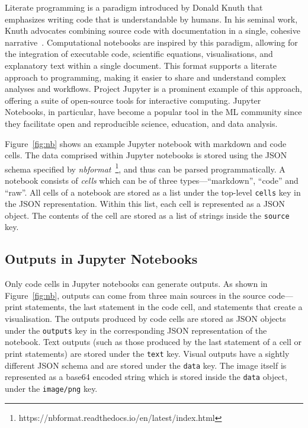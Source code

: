 Literate programming is a paradigm introduced by Donald Knuth that emphasizes writing code that is understandable by humans. In his seminal work, Knuth advocates combining source code with documentation in a single, cohesive narrative~\cite{knuth1984literate}. Computational notebooks are inspired by this paradigm, allowing for the integration of executable code, scientific equations, visualisations, and explanatory text within a single document. This format supports a literate approach to programming, making it easier to share and understand complex analyses and workflows. Project Jupyter is a prominent example of this approach, offering a suite of open-source tools for interactive computing. Jupyter Notebooks, in particular, have become a popular tool in the ML community since they facilitate open and reproducible science, education, and data analysis.

Figure~\ref{fig:nb} shows an example Jupyter notebook with markdown and code cells. The data comprised within Jupyter notebooks is stored using the JSON schema specified by \emph{nbformat}~\footnote{https://nbformat.readthedocs.io/en/latest/index.html}, and thus can be parsed programmatically. A notebook consists of \emph{cells} which can be of three types---``markdown'', ``code'' and ``raw''. All cells of a notebook are stored as a list under the top-level \lstinline[language={}]$cells$ key in the JSON representation. Within this list, each cell is represented as a JSON object. The contents of the cell are stored as a list of strings inside the \lstinline[language={}]$source$ key.

\subsection{Outputs in Jupyter Notebooks}

Only code cells in Jupyter notebooks can generate outputs. As shown in Figure~\ref{fig:nb}, outputs can come from three main sources in the source code---print statements, the last statement in the code cell, and statements that create a visualisation. The outputs produced by code cells are stored as JSON objects under the \lstinline[language={}]$outputs$ key in the corresponding JSON representation of the notebook. Text outputs (such as those produced by the last statement of a cell or print statements) are stored under the \lstinline[language={}]$text$ key. Visual outputs have a sightly different JSON schema and are stored under the \lstinline[language={}]$data$ key. The image itself is represented as a base64 encoded string which is stored inside the \lstinline[language={}]$data$ object, under the \lstinline[language={}]$image/png$ key.


